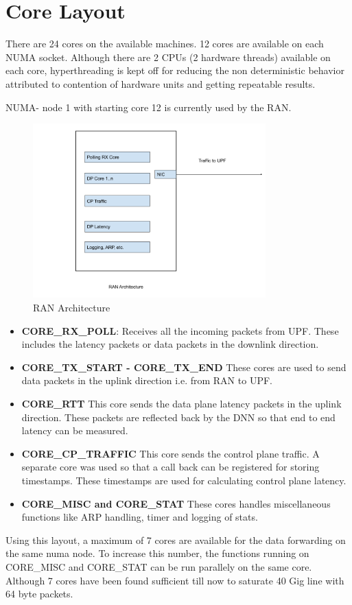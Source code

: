 

\section{Core Layout}
There are 24 cores on the available machines. 12 cores are available on each NUMA socket.
Although there are 2 CPUs (2 hardware threads) available on each core, hyperthreading is
kept off for reducing the non deterministic behavior attributed to contention of hardware units
and getting repeatable results.

NUMA- node 1 with starting core 12 is currently used by the RAN.
 \begin{figure}[htbp]
    \centering
    \includegraphics[width=0.8\textwidth, keepaspectratio]{./fig/Introduction/RANArchitecture.png}
    \caption{RAN Architecture}
    \label{fig:RAN}
\end{figure}

\begin{itemize}
	\item \textbf{CORE\_RX\_POLL}: Receives all the incoming packets from UPF. These includes the latency packets or data packets in the downlink direction.
	\item \textbf{CORE\_TX\_START - CORE\_TX\_END}
	      These cores are used to send data packets in the uplink  direction i.e. from RAN to UPF.
	\item \textbf{CORE\_RTT}
	      This core sends the data plane latency packets in the uplink direction. These packets are reflected back by the DNN so that end to end latency can be measured.
	\item \textbf{CORE\_CP\_TRAFFIC} This core sends the control plane traffic. A separate core was used so that a call back can be registered for storing timestamps. These timestamps are used for calculating control plane latency.
	\item \textbf{CORE\_MISC and CORE\_STAT}
	      These cores handles miscellaneous functions like ARP handling, timer and logging of stats.
\end{itemize}
Using this layout, a maximum of 7 cores are available for the data forwarding on the same numa node.
To increase this number, the functions running on CORE\_MISC and CORE\_STAT can be run parallely on the same core. Although 7 cores have been found sufficient till now to saturate 40 Gig line with 64 byte packets.


